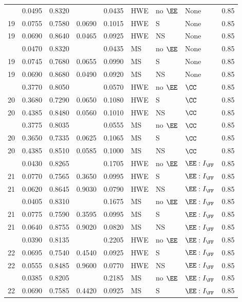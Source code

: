 \begin{longtable}[t]{lllllllll}
\endfoot
\bottomrule
\endlastfoot
19 & 0.0495 & 0.8320 &  & 0.0435 & HWE & no $\EE$ & None & 0.85\\
19 & 0.0755 & 0.7580 & 0.0690 & 0.1015 & HWE & S & None & 0.85\\
19 & 0.0690 & 0.8640 & 0.0465 & 0.0925 & HWE & NS & None & 0.85\\
\addlinespace
19 & 0.0470 & 0.8320 &  & 0.0435 & MS & no $\EE$ & None & 0.85\\
19 & 0.0745 & 0.7680 & 0.0655 & 0.0990 & MS & S & None & 0.85\\
19 & 0.0690 & 0.8680 & 0.0490 & 0.0920 & MS & NS & None & 0.85\\
\addlinespace
20 & 0.3770 & 0.8050 &  & 0.0570 & HWE & no $\EE$ & $\CC$ & 0.85\\
20 & 0.3680 & 0.7290 & 0.0650 & 0.1080 & HWE & S & $\CC$ & 0.85\\
20 & 0.4385 & 0.8480 & 0.0560 & 0.1010 & HWE & NS & $\CC$ & 0.85\\
\addlinespace
20 & 0.3775 & 0.8035 &  & 0.0555 & MS & no $\EE$ & $\CC$ & 0.85\\
20 & 0.3650 & 0.7335 & 0.0625 & 0.1065 & MS & S & $\CC$ & 0.85\\
20 & 0.4385 & 0.8510 & 0.0585 & 0.1000 & MS & NS & $\CC$ & 0.85\\
\addlinespace
21 & 0.0430 & 0.8265 &  & 0.1705 & HWE & no $\EE$ & $\EE:I_{\FF}$ & 0.85\\
21 & 0.0770 & 0.7565 & 0.3650 & 0.0995 & HWE & S & $\EE:I_{\FF}$ & 0.85\\
21 & 0.0620 & 0.8645 & 0.9030 & 0.0790 & HWE & NS & $\EE:I_{\FF}$ & 0.85\\
\addlinespace
21 & 0.0405 & 0.8310 &  & 0.1675 & MS & no $\EE$ & $\EE:I_{\FF}$ & 0.85\\
21 & 0.0775 & 0.7590 & 0.3595 & 0.0995 & MS & S & $\EE:I_{\FF}$ & 0.85\\
21 & 0.0640 & 0.8755 & 0.9020 & 0.0820 & MS & NS & $\EE:I_{\FF}$ & 0.85\\
\addlinespace
22 & 0.0390 & 0.8135 &  & 0.2205 & HWE & no $\EE$ & $\EE:I_{\FF}$ & 0.85\\
22 & 0.0695 & 0.7540 & 0.4540 & 0.0925 & HWE & S & $\EE:I_{\FF}$ & 0.85\\
22 & 0.0555 & 0.8485 & 0.9600 & 0.0770 & HWE & NS & $\EE:I_{\FF}$ & 0.85\\
\addlinespace
22 & 0.0385 & 0.8205 &  & 0.2185 & MS & no $\EE$ & $\EE:I_{\FF}$ & 0.85\\
22 & 0.0690 & 0.7585 & 0.4420 & 0.0925 & MS & S & $\EE:I_{\FF}$ & 0.85\\

\end{longtable}
